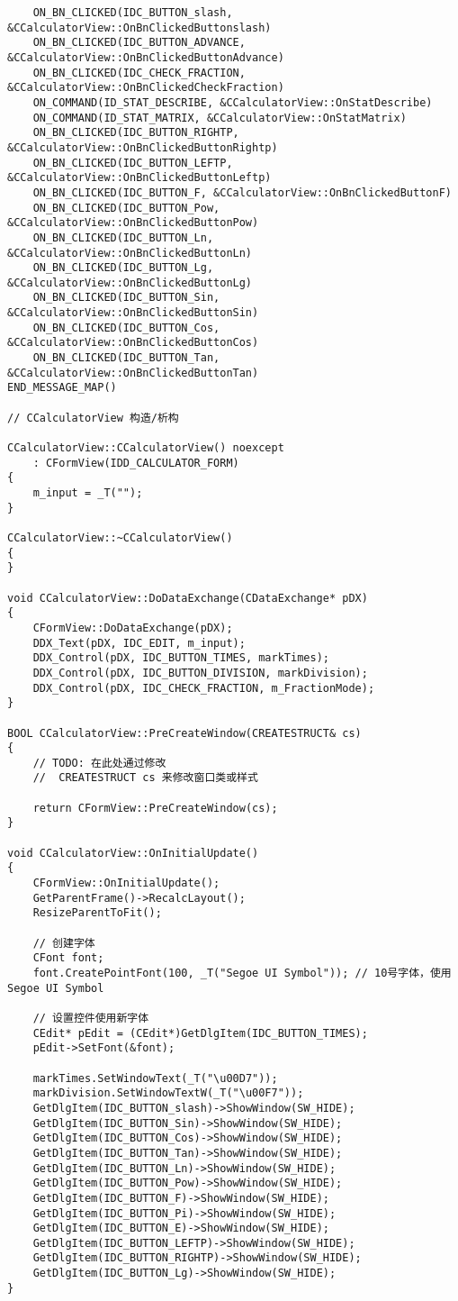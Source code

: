 \begin{lstlisting}
    ON_BN_CLICKED(IDC_BUTTON_slash, &CCalculatorView::OnBnClickedButtonslash)
    ON_BN_CLICKED(IDC_BUTTON_ADVANCE, &CCalculatorView::OnBnClickedButtonAdvance)
    ON_BN_CLICKED(IDC_CHECK_FRACTION, &CCalculatorView::OnBnClickedCheckFraction)
    ON_COMMAND(ID_STAT_DESCRIBE, &CCalculatorView::OnStatDescribe)
    ON_COMMAND(ID_STAT_MATRIX, &CCalculatorView::OnStatMatrix)
    ON_BN_CLICKED(IDC_BUTTON_RIGHTP, &CCalculatorView::OnBnClickedButtonRightp)
    ON_BN_CLICKED(IDC_BUTTON_LEFTP, &CCalculatorView::OnBnClickedButtonLeftp)
    ON_BN_CLICKED(IDC_BUTTON_F, &CCalculatorView::OnBnClickedButtonF)
    ON_BN_CLICKED(IDC_BUTTON_Pow, &CCalculatorView::OnBnClickedButtonPow)
    ON_BN_CLICKED(IDC_BUTTON_Ln, &CCalculatorView::OnBnClickedButtonLn)
    ON_BN_CLICKED(IDC_BUTTON_Lg, &CCalculatorView::OnBnClickedButtonLg)
    ON_BN_CLICKED(IDC_BUTTON_Sin, &CCalculatorView::OnBnClickedButtonSin)
    ON_BN_CLICKED(IDC_BUTTON_Cos, &CCalculatorView::OnBnClickedButtonCos)
    ON_BN_CLICKED(IDC_BUTTON_Tan, &CCalculatorView::OnBnClickedButtonTan)
END_MESSAGE_MAP()

// CCalculatorView 构造/析构

CCalculatorView::CCalculatorView() noexcept
    : CFormView(IDD_CALCULATOR_FORM)
{
    m_input = _T("");
}

CCalculatorView::~CCalculatorView()
{
}

void CCalculatorView::DoDataExchange(CDataExchange* pDX)
{
    CFormView::DoDataExchange(pDX);
    DDX_Text(pDX, IDC_EDIT, m_input);
    DDX_Control(pDX, IDC_BUTTON_TIMES, markTimes);
    DDX_Control(pDX, IDC_BUTTON_DIVISION, markDivision);
    DDX_Control(pDX, IDC_CHECK_FRACTION, m_FractionMode);
}

BOOL CCalculatorView::PreCreateWindow(CREATESTRUCT& cs)
{
    // TODO: 在此处通过修改
    //  CREATESTRUCT cs 来修改窗口类或样式

    return CFormView::PreCreateWindow(cs);
}

void CCalculatorView::OnInitialUpdate()
{
    CFormView::OnInitialUpdate();
    GetParentFrame()->RecalcLayout();
    ResizeParentToFit();

    // 创建字体
    CFont font;
    font.CreatePointFont(100, _T("Segoe UI Symbol")); // 10号字体，使用 Segoe UI Symbol

    // 设置控件使用新字体
    CEdit* pEdit = (CEdit*)GetDlgItem(IDC_BUTTON_TIMES);
    pEdit->SetFont(&font);

    markTimes.SetWindowText(_T("\u00D7"));
    markDivision.SetWindowTextW(_T("\u00F7"));
    GetDlgItem(IDC_BUTTON_slash)->ShowWindow(SW_HIDE);
    GetDlgItem(IDC_BUTTON_Sin)->ShowWindow(SW_HIDE);
    GetDlgItem(IDC_BUTTON_Cos)->ShowWindow(SW_HIDE);
    GetDlgItem(IDC_BUTTON_Tan)->ShowWindow(SW_HIDE);
    GetDlgItem(IDC_BUTTON_Ln)->ShowWindow(SW_HIDE);
    GetDlgItem(IDC_BUTTON_Pow)->ShowWindow(SW_HIDE);
    GetDlgItem(IDC_BUTTON_F)->ShowWindow(SW_HIDE);
    GetDlgItem(IDC_BUTTON_Pi)->ShowWindow(SW_HIDE);
    GetDlgItem(IDC_BUTTON_E)->ShowWindow(SW_HIDE);
    GetDlgItem(IDC_BUTTON_LEFTP)->ShowWindow(SW_HIDE);
    GetDlgItem(IDC_BUTTON_RIGHTP)->ShowWindow(SW_HIDE);
    GetDlgItem(IDC_BUTTON_Lg)->ShowWindow(SW_HIDE);
}



\end{lstlisting}
